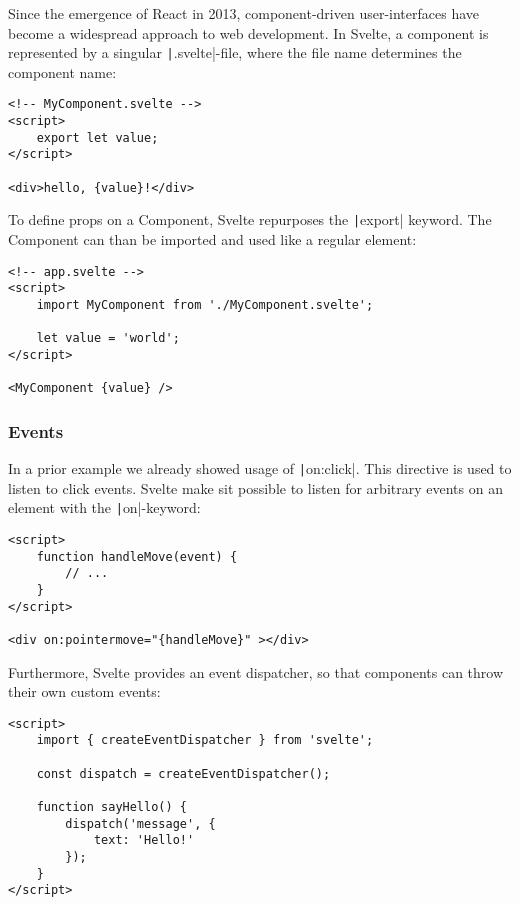 
Since the emergence of React in 2013, component-driven user-interfaces have become a widespread approach to web development. In Svelte, a component is represented by a singular \texttt|.svelte|-file, where the file name determines the component name: 

\begin{verbatim}
<!-- MyComponent.svelte -->
<script>
    export let value;
</script>

<div>hello, {value}!</div>
\end{verbatim}

To define props on a Component, Svelte repurposes the \texttt|export| keyword. The Component can than be imported and used like a regular element:

\begin{verbatim}
<!-- app.svelte -->
<script>
    import MyComponent from './MyComponent.svelte';

    let value = 'world';
</script>

<MyComponent {value} />
\end{verbatim}

\subsubsection{Events}


In a prior example we already showed usage of \texttt|on:click|. This directive is used to listen to click events. Svelte make sit possible to listen for arbitrary events on an element with the \texttt|on|-keyword:

\begin{verbatim}
<script>
    function handleMove(event) {
        // ...
    }
</script>

<div on:pointermove="{handleMove}" ></div>
\end{verbatim}

Furthermore, Svelte provides an event dispatcher, so that components can throw their own custom events:

\begin{verbatim}
<script>
    import { createEventDispatcher } from 'svelte';

    const dispatch = createEventDispatcher();

    function sayHello() {
        dispatch('message', {
            text: 'Hello!'
        });
    }
</script>
\end{verbatim}

